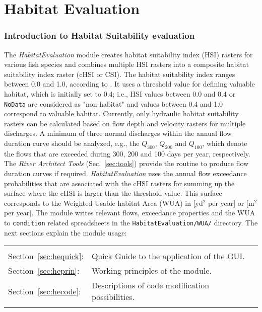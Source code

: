 \newpage
\part{Habitat Evaluation} \label{part:he}

\section{Introduction to Habitat Suitability evaluation} \label{sec:heintro}
The \textit{HabitatEvaluation} module creates habitat suitability index (HSI) rasters for various fish species and combines multiple HSI rasters into a composite habitat suitability index raster (cHSI or CSI). The habitat suitability index ranges between 0.0 and 1.0, according to \citet{bovee86}. It uses a threshold value for defining valuable habitat, which is initially set to 0.4; i.e., HSI values between 0.0 and 0.4 or \texttt{NoData} are considered as "non-habitat" and values between 0.4 and 1.0 correspond to valuable habitat. Currently, only hydraulic habitat suitability rasters can be calculated based on flow depth and velocity rasters for multiple discharges. A minimum of three normal discharges within the annual flow duration curve should be analyzed, e.g., the $Q_{300}$, $Q_{200}$ and $Q_{100}$, which denote the flows that are exceeded during 300, 200 and 100 days per year, respectively. The \textit{River Architect Tools} (Sec.~\ref{sec:tools}) provide the  routine to produce flow duration curves if required. \textit{HabitatEvaluation} uses the annual flow exceedance probabilities that are associated with the cHSI rasters for summing up the surface where the cHSI is larger than the threshold value. This surface corresponds to the Weighted Usable habitat Area (WUA) in [yd$^2$ per year] or [m$^2$ per year]. The module writes relevant flows, exceedance properties and the WUA to \texttt{condition} related spreadsheets in the \texttt{HabitatEvaluation/WUA/} directory. The next sections explain the module usage:\\

\begin{tabular}{l L{0.9\textwidth}}
\\
Section~\ref{sec:hequick}: & Quick Guide to the application of the GUI.\\
Section~\ref{sec:heprin}:  & Working principles of the module.\\
Section~\ref{sec:hecode}:  & Descriptions of code modification possibilities.\\
\\
\end{tabular}



